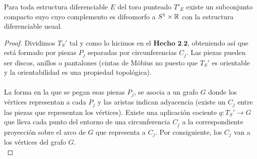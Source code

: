 \begin{hecho}
	Para toda estructura diferenciable $E$ del toro punteado $T'_E$ existe un subconjunto compacto suyo cuyo complemento es difeomorfo a $S^1 \times \mathbb{R}$ con la estructura diferenciable usual.
\end{hecho}

\begin{proof}
	Dividimos $T_S'$ tal y como lo hicimos en el $\textbf{Hecho 2.2}$, obteniendo así que está formado por piezas $P_j$ separadas por circunferencias $C_j$. Las piezas pueden ser discos, anillos o pantalones (cintas de Möbius no puesto que $T_S'$ es orientable y la orientabilidad es una propiedad topológica).\\
	\\ La forma en la que se pegan esas piezas $P_j$, se asocia a un grafo $G$ donde los vértices representan a cada $P_j$ y las aristas indican adyacencia (existe un $C_j$ entre las piezas que representan los vértices). Existe una aplicación cociente $q: T_S' \rightarrow G$ que lleva cada punto del entorno de una circunferencia $C_j$ a la correspondiente proyección sobre el arco de $G$ que representa a $C_j$. Por consiguiente, los $C_j$ van a los vértices del grafo $G$.\\


\end{proof}
